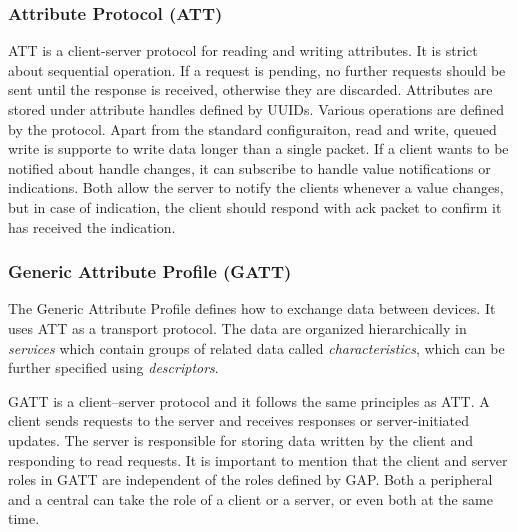 \subsubsection{Attribute Protocol (ATT)}
ATT is a client-server protocol for reading and writing attributes. It is strict about sequential operation. If a request is pending, no further requests should be sent until the response is received, otherwise they are discarded. Attributes are stored under attribute handles defined by UUIDs. Various operations are defined by the protocol. Apart from the standard configuraiton, read and write, queued write is supporte to write data longer than a single packet. If a client wants to be notified about handle changes, it can subscribe to handle value notifications or indications. Both allow the server to notify the clients whenever a value changes, but in case of indication, the client should respond with ack packet to confirm it has received the indication.

\subsubsection{Generic Attribute Profile (GATT)}

The Generic Attribute Profile defines how to exchange data between devices. It uses ATT as a transport protocol. The data are organized hierarchically in \textit{services} which contain groups of related data called \textit{characteristics}, which can be further specified using \textit{descriptors}.

GATT is a client–server protocol and it follows the same principles as ATT. A client sends requests to the server and receives responses or server-initiated updates. The server is responsible for storing data written by the client and responding to read requests. It is important to mention that the client and server roles in GATT are independent of the roles defined by GAP. Both a peripheral and a central can take the role of a client or a server, or even both at the same time.



